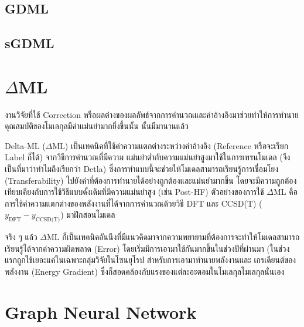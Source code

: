 \subsection{GDML}

\autocite{chmiela2017}

\subsection{sGDML}

\autocite{chmiela2018}

\autocite{sauceda2020}

\section{$\Delta$ML}

งานวิจัยที่ใช้ Correction หรือผลต่างของผลลัพธ์จากการคำนวณและค่าอ้างอิงมาช่วยทำให้การทำนายคุณสมบัติของโมเลกุลมีค่าแม่นยำมากยิ่งขึ้นนั้น%
นั้นมีมานานแล้ว\autocite{hu2003,wu2007,balabin2009}

Delta-ML ($\Delta$ML) เป็นเทคนิคที่ใช้ค่าความแตกต่างระหว่างค่าอ้างอิง (Reference หรือจะเรียก Label ก็ได้) จากวิธีการคำนวณที่มีความ%
แม่นยำต่ำกับความแม่นยำสูงมาใช้ในการเทรนโมเดล (จึงเป็นที่มาว่าทำไมถึงเรียกว่า Detla) ซึ่งการทำแบบนี้จะช่วยให้โมเดลสามารถเรียนรู้การเชื่อมโยง 
(Transferability) ไปยังค่าที่ต้องการทำนายได้อย่างถูกต้องและแม่นยำมากขึ้น โดยจะมีความถูกต้องเทียบเคียงกับการใช้วิธีแบบดั้งเดิมที่มีความแม่นยำสูง 
(เช่น Post-HF) ตัวอย่างของการใช้ $\Delta$ML คือการใช้ค่าความแตกต่างของพลังงานที่ได้จากการคำนวณด้วยวิธี DFT และ CCSD(T) 
($y_{\text{DFT}} - y_{\text{CCSD(T)}}$) มาฝึกสอนโมเดล\autocite{ramakrishnan2015a}

จริง ๆ แล้ว $\Delta$ML ก็เป็นเทคนิคอันนึงที่มีแนวคิดมาจากความพยายามที่ต้องการจะทำให้โมเดลสามารถเรียนรู้ได้จากค่าความผิดพลาด (Error) 
โดยเริ่มมีการเอามาใช้กันมากขึ้นในช่วงปีที่ผ่านมา (ในช่วงแรกถูกใช้เยอะแค่ในเฉพาะกลุ่มวิจัยในโซนยุโรป สำหรับการเอามาทำนายพลังงานและ%
เกรเดียนต์ของพลังงาน (Energy Gradient) ซึ่งก็สอดคล้องกับแรงของแต่ละอะตอมในโมเลกุลโมเลกุลนั่นเอง

\section{Graph Neural Network}

